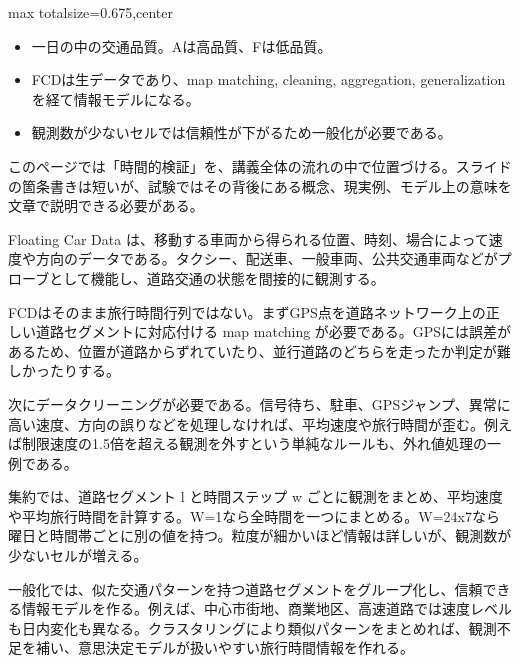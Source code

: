 \clearpage
{}
\begin{adjustbox}{max totalsize={\textwidth}{0.675\textheight},center}
\begin{minipage}{\textwidth}\scriptsize
\begin{minipage}[t]{0.485\textwidth}
\begin{itemize}
\item 一日の中の交通品質。Aは高品質、Fは低品質。
\end{itemize}
\begin{itemize}
\item FCDは生データであり、map matching, cleaning, aggregation, generalization を経て情報モデルになる。
\item 観測数が少ないセルでは信頼性が下がるため一般化が必要である。
\end{itemize}
\end{minipage}\hfill
\begin{minipage}[t]{0.485\textwidth}
このページでは「時間的検証」を、講義全体の流れの中で位置づける。スライドの箇条書きは短いが、試験ではその背後にある概念、現実例、モデル上の意味を文章で説明できる必要がある。\par
Floating Car Data は、移動する車両から得られる位置、時刻、場合によって速度や方向のデータである。タクシー、配送車、一般車両、公共交通車両などがプローブとして機能し、道路交通の状態を間接的に観測する。\par
FCDはそのまま旅行時間行列ではない。まずGPS点を道路ネットワーク上の正しい道路セグメントに対応付ける map matching が必要である。GPSには誤差があるため、位置が道路からずれていたり、並行道路のどちらを走ったか判定が難しかったりする。\par
次にデータクリーニングが必要である。信号待ち、駐車、GPSジャンプ、異常に高い速度、方向の誤りなどを処理しなければ、平均速度や旅行時間が歪む。例えば制限速度の1.5倍を超える観測を外すという単純なルールも、外れ値処理の一例である。\par
集約では、道路セグメント l と時間ステップ w ごとに観測をまとめ、平均速度や平均旅行時間を計算する。W=1なら全時間を一つにまとめる。W=24x7なら曜日と時間帯ごとに別の値を持つ。粒度が細かいほど情報は詳しいが、観測数が少ないセルが増える。\par
一般化では、似た交通パターンを持つ道路セグメントをグループ化し、信頼できる情報モデルを作る。例えば、中心市街地、商業地区、高速道路では速度レベルも日内変化も異なる。クラスタリングにより類似パターンをまとめれば、観測不足を補い、意思決定モデルが扱いやすい旅行時間情報を作れる。\par

\end{minipage}
\end{minipage}
\end{adjustbox}
